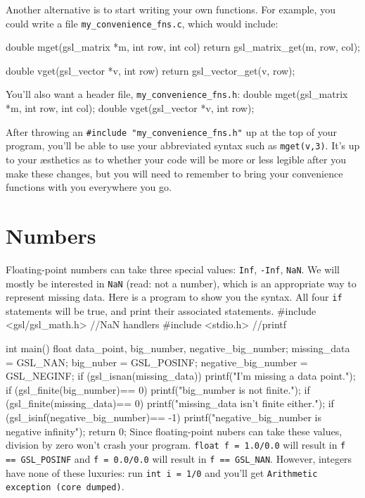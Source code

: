 Another alternative is to start writing your own functions. For example, you
could write a file {\tt my\_convenience\_fns.c}, which would include:

double mget(gsl_matrix *m, int row, int col){
   return gsl_matrix_get(m, row, col);
}

double vget(gsl_vector *v, int row){
   return gsl_vector_get(v, row);
}

You'll also want a header file, {\tt my\_convenience\_fns.h}:
double mget(gsl_matrix *m, int row, int col);
double vget(gsl_vector *v, int row);

After throwing an {\tt \#include "my\_convenience\_fns.h"} up at the top of your
program, you'll be able to use your abbreviated syntax such as {\tt mget(v,3)}.
It's up to your \ae sthetics as to whether your code will be more or less
legible after you make these changes, but you will need to remember to
bring your convenience functions with you everywhere you go.


\section{Numbers}      
Floating-point numbers can take three special values: {\tt Inf}, {\tt -Inf}, {\tt NaN}. We will mostly be
interested in {\tt NaN} (read: not a number), which is an appropriate way to represent missing data. Here is a
program to show you the syntax. All four {\tt if} statements will be true, and print their associated
statements.
#include <gsl/gsl_math.h>   //NaN handlers
#include <stdio.h>          //printf

int main(){
float data_point, big_number, negative_big_number;
missing_data = GSL_NAN;
big_nuber = GSL_POSINF;
negative_big_number = GSL_NEGINF;
if (gsl_isnan(missing_data))
    printf("I'm missing a data point.");
if (gsl_finite(big_number)== 0)
    printf("big_number is not finite.");
if (gsl_finite(missing_data)== 0)
    printf("missing_data isn't finite either.");
if (gsl_isinf(negative_big_number)== -1)
    printf("negative_big_number is negative infinity");
return 0;
}
Since floating-point nubers can take these values, division by zero
won't crash your program. {\tt float f = 1.0/0.0} will result in
{\tt f == GSL\_POSINF} and {\tt f = 0.0/0.0} will result in {\tt f ==
GSL\_NAN}. However, integers have none of these luxuries: run {\tt int
i = 1/0} and you'll get {\tt Arithmetic exception (core dumped)}.


